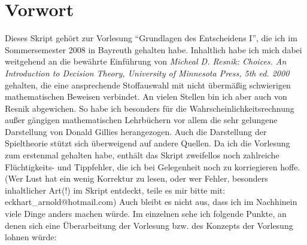 \chapter*{Vorwort}

Dieses Skript gehört zur Vorlesung "`Grundlagen des Entscheidens I"', die ich im
Sommersemester 2008 in Bayreuth gehalten habe. Inhaltlich habe ich mich dabei
weitgehend an die bewährte Einführung von {\em Micheal D. Resnik: Choices. An
Introduction to Decision Theory, University of Minnesota Press, 5th ed. 2000
\cite{resnik:1987}} gehalten, die eine ansprechende Stoffauswahl mit nicht
übermäßig schwierigen mathematischen Beweisen verbindet. An vielen Stellen bin
ich aber auch von Resnik abgewichen. So habe ich besonders für die
Wahrscheinlichkeitsrechnung außer gängigen mathematischen Lehrbüchern vor allem
die sehr gelungene Darstellung von Donald Gillies \cite{gillies:2000}
herangezogen. Auch die Darstellung der Spieltheorie stützt sich überweigend auf
andere Quellen. Da ich die Vorlesung zum erstenmal gehalten habe, enthält das
Skript zweifellos noch zahlreiche Flüchtigkeits- und Tippfehler, die ich bei
Gelegenheit noch zu korriegieren hoffe. (Wer Lust hat ein wenig Korrektur zu
lesen, oder wer Fehler, besonders inhaltlicher Art(!) im Skript entdeckt, teile
es mir bitte mit: eckhart\_arnold@hotmail.com) Auch bleibt es nicht aus, dass
ich im Nachhinein viele Dinge anders machen würde. Im einzelnen sehe ich folgende Punkte, an denen sich eine Überarbeitung der Vorlesung bzw. des Konzepts der Vorlesung lohnen würde:

